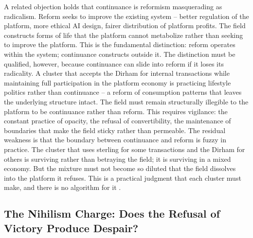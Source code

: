 A related objection holds that continuance is reformism masquerading as radicalism. Reform seeks to improve the existing system – better regulation of the platform, more ethical AI design, fairer distribution of platform profits. The field constructs forms of life that the platform cannot metabolize rather than seeking to improve the platform. This is the fundamental distinction: reform operates within the system; continuance constructs outside it. The distinction must be qualified, however, because continuance can slide into reform if it loses its radicality. A cluster that accepts the Dirham for internal transactions while maintaining full participation in the platform economy is practicing lifestyle politics rather than continuance – a reform of consumption patterns that leaves the underlying structure intact. The field must remain structurally illegible to the platform to be continuance rather than reform. This requires vigilance: the constant practice of opacity, the refusal of convertibility, the maintenance of boundaries that make the field sticky rather than permeable. The residual weakness is that the boundary between continuance and reform is fuzzy in practice. The cluster that uses sterling for some transactions and the Dirham for others is surviving rather than betraying the field; it is surviving in a mixed economy. But the mixture must not become so diluted that the field dissolves into the platform it refuses. This is a practical judgment that each cluster must make, and there is no algorithm for it \cite[pp.~328-350]{scott_1985}.

\subsection{The Nihilism Charge: Does the Refusal of Victory Produce Despair?}

